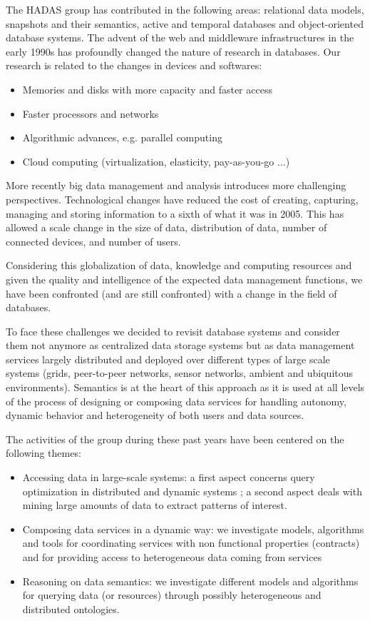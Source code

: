 The HADAS group has contributed in the following areas: relational data models, snapshots and their semantics, active and temporal databases and object-oriented database systems. The advent of the web and middleware infrastructures in the early 1990s has profoundly changed the nature of research in databases. 
Our research is related to the changes in devices and softwares:
\begin{itemize}
\item Memories and disks with more capacity and faster access
\item Faster processors and networks
\item Algorithmic advances, e.g. parallel computing
\item Cloud computing (virtualization, elasticity, pay-as-you-go ...)
\end{itemize}

More recently big data management and analysis introduces  more challenging perspectives. Technological changes have reduced the cost of creating, capturing, managing and storing information to a sixth of what it was in 2005. This has allowed a scale change in the size of data, distribution of data, number of connected devices, and number of users. 

Considering this globalization of data, knowledge and computing resources and given the quality and intelligence of the expected data management functions, we have been confronted (and are still confronted) with a change in the field of databases.

To face these challenges we decided to revisit database systems and consider them not anymore as centralized data storage systems but as data management services largely distributed and deployed over different types of large scale systems (grids, peer-to-peer networks, sensor networks, ambient and ubiquitous environments). 
Semantics is at the heart of this approach as it is used at all levels of the process of designing or composing data services for handling autonomy, dynamic behavior and heterogeneity of both users and data sources. 

The activities of the group during these past years have been centered on the following themes:
\begin{itemize}
\item  Accessing data in large-scale systems: a first aspect concerns query optimization in distributed and dynamic systems ; a second aspect deals with mining large amounts of data to extract patterns of interest.
\item  Composing data services in a dynamic way:  we investigate models, algorithms and tools for coordinating services with non functional properties (contracts) and for providing access to heterogeneous data coming from services
\item  Reasoning on data semantics: we investigate different models and  algorithms  for querying data (or resources) through  possibly heterogeneous and distributed ontologies.
\end{itemize}

